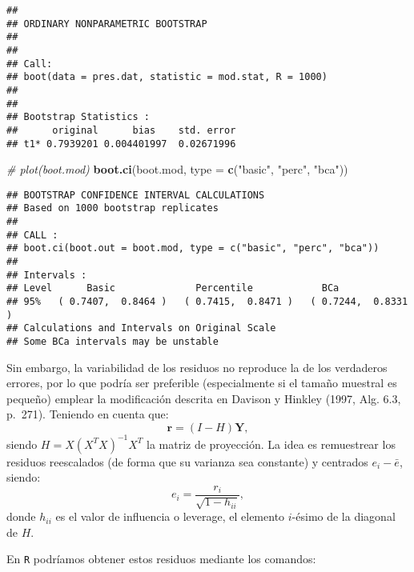 \documentclass[]{book}
\newenvironment{Shaded}{\begin{snugshade}}{\end{snugshade}}
\newcommand{\KeywordTok}[1]{\textcolor[rgb]{0.13,0.29,0.53}{\textbf{#1}}}
\newcommand{\DataTypeTok}[1]{\textcolor[rgb]{0.13,0.29,0.53}{#1}}
\newcommand{\DecValTok}[1]{\textcolor[rgb]{0.00,0.00,0.81}{#1}}
\newcommand{\StringTok}[1]{\textcolor[rgb]{0.31,0.60,0.02}{#1}}
\newcommand{\CommentTok}[1]{\textcolor[rgb]{0.56,0.35,0.01}{\textit{#1}}}
\newcommand{\OperatorTok}[1]{\textcolor[rgb]{0.81,0.36,0.00}{\textbf{#1}}}
\newcommand{\NormalTok}[1]{#1}
\theoremstyle{break}
\theoremstyle{definition}
\theoremstyle{definition}
\theoremstyle{definition}
\theoremstyle{remark}
\begin{document}
\begin{verbatim}
## 
## ORDINARY NONPARAMETRIC BOOTSTRAP
## 
## 
## Call:
## boot(data = pres.dat, statistic = mod.stat, R = 1000)
## 
## 
## Bootstrap Statistics :
##      original      bias    std. error
## t1* 0.7939201 0.004401997  0.02671996
\end{verbatim}

\begin{Shaded}
\begin{Highlighting}[]
\CommentTok{# plot(boot.mod)}
\KeywordTok{boot.ci}\NormalTok{(boot.mod, }\DataTypeTok{type =} \KeywordTok{c}\NormalTok{(}\StringTok{"basic"}\NormalTok{, }\StringTok{"perc"}\NormalTok{, }\StringTok{"bca"}\NormalTok{))}
\end{Highlighting}
\end{Shaded}

\begin{verbatim}
## BOOTSTRAP CONFIDENCE INTERVAL CALCULATIONS
## Based on 1000 bootstrap replicates
## 
## CALL : 
## boot.ci(boot.out = boot.mod, type = c("basic", "perc", "bca"))
## 
## Intervals : 
## Level      Basic              Percentile            BCa          
## 95%   ( 0.7407,  0.8464 )   ( 0.7415,  0.8471 )   ( 0.7244,  0.8331 )  
## Calculations and Intervals on Original Scale
## Some BCa intervals may be unstable
\end{verbatim}

Sin embargo, la variabilidad de los residuos no reproduce la de los
verdaderos errores, por lo que podría ser preferible (especialmente si
el tamaño muestral es pequeño) emplear la modificación descrita en
Davison y Hinkley (1997, Alg. 6.3, p.~271). Teniendo en cuenta que:
\[\mathbf{r} = \left( I - H \right)\mathbf{Y},\] siendo
\(H = X\left( X^{T}X\right)^{-1}X^{T}\) la matriz de proyección. La idea
es remuestrear los residuos reescalados (de forma que su varianza sea
constante) y centrados \(e_i - \bar{e}\), siendo:
\[e_i = \frac{r_i}{\sqrt{1 - h_{ii}}},\] donde \(h_{ii}\) es el valor de
influencia o leverage, el elemento \(i\)-ésimo de la diagonal de \(H\).

En \texttt{R} podríamos obtener estos residuos mediante los comandos:

\begin{Shaded}
\end{Shaded}
\end{document}
